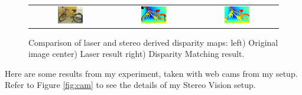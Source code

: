 \documentclass[11pt,fleqn]{article}
\begin{document}
\begin{figure}
\begin{mdframed}
\centering
\setlength{}
\begin{tabular}{ccc}
\includegraphics[width=0.33\textwidth]{images/_im0-600.jpg} &
\includegraphics[width=0.33\textwidth]{images/disp0GT-600.jpg} &
\includegraphics[width=0.33\textwidth]{images/_disp-600.jpg} \\[2pt]
\end{tabular}
\caption[Comparison of laser and stereo derived disparity maps]{Comparison of laser and stereo derived disparity maps: left) Original image center) Laser result right) Disparity Matching result.}
\label{fig:result1}
\end{mdframed}
\end{figure}

\newpage
Here are some results from my experiment, taken with web cams from my setup. Refer to Figure \ref{fig:cam} to see the details of my Stereo Vision setup.\\
\end{document}
